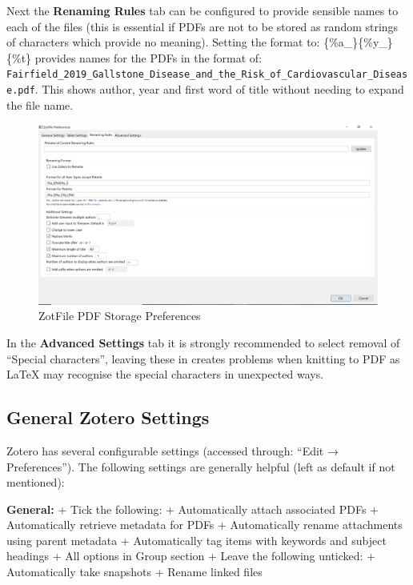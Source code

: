 \documentclass[
]{book}
\begin{document}
Next the \textbf{Renaming Rules} tab can be configured to provide sensible names to each of the files (this is essential if PDFs are not to be stored as random strings of characters which provide no meaning). Setting the format to: \{\%a\_\}\{\%y\_\}\{\%t\} provides names for the PDFs in the format of: \texttt{Fairfield\_2019\_Gallstone\_Disease\_and\_the\_Risk\_of\_Cardiovascular\_Disease.pdf}. This shows author, year and first word of title without needing to expand the file name.

\begin{figure}
\includegraphics[width=44.47in]{img/zotfile_renaming} \caption{ZotFile PDF Storage Preferences}\label{fig:zotfile-renaming}
\end{figure}

In the \textbf{Advanced Settings} tab it is strongly recommended to select removal of ``Special characters'', leaving these in creates problems when knitting to PDF as LaTeX may recognise the special characters in unexpected ways.

\hypertarget{general-zotero-settings}{%
\subsection{General Zotero Settings}\label{general-zotero-settings}}

Zotero has several configurable settings (accessed through: ``Edit → Preferences''). The following settings are generally helpful (left as default if not mentioned):

\textbf{General:}
+ Tick the following:
+ Automatically attach associated PDFs
+ Automatically retrieve metadata for PDFs
+ Automatically rename attachments using parent metadata
+ Automatically tag items with keywords and subject headings
+ All options in Group section
+ Leave the following unticked:
+ Automatically take snapshots
+ Rename linked files
\end{document}

